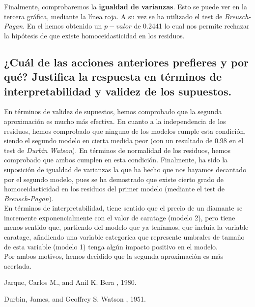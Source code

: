 \documentclass[a4paper, 9pt]{article}
\begin{document}
Finalmente, comprobaremos la \textbf{igualdad de varianzas}. Esto se puede ver en la tercera gráfica, mediante la línea roja. A su vez se ha utilizado el test de \textit{Breusch-Pagan}. En el hemos obtenido un $p-valor$ de 0.2441 lo cual nos permite rechazar la hipótesis de que existe homoceidasticidad en los residuos.

\subsection{¿Cuál de las acciones anteriores prefieres y por qué? Justifica la respuesta en términos de interpretabilidad y validez de los supuestos.}
\label{subsec:question-4}

En términos de validez de supuestos, hemos comprobado que la segunda aproximación es mucho más efectiva. En cuanto a la independencia de los residuos, hemos comprobado que ninguno de los modelos cumple esta condición, siendo el segundo modelo en cierta medida peor (con un resultado de 0.98 en el test de \textit{Durbin Watson}). En términos de normalidad de los residuos, hemos comprobado que ambos cumplen en esta condición. Finalmente, ha sido la suposición de igualdad de varianzas la que ha hecho que nos hayamos decantado por el segundo modelo, pues se ha demostrado que existe cierto grado de homoceidasticidad en los residuos del primer modelo (mediante el test de \textit{Breusch-Pagan}). \\

En términos de interpretabilidad, tiene sentido que el precio de un diamante se incremente exponencialmente con el valor de caratage (modelo 2), pero tiene menos sentido que, partiendo del modelo que ya teníamos, que incluía la variable caratage, añadiendo una variable categorica que represente umbrales de tamaño de esta variable (modelo 1) tenga algún impacto positivo en el modelo.\\

Por ambos motivos, hemos decidido que la segunda aproximación es más acertada.

\begin{thebibliography}{9}
    Jarque, Carlos M., and Anil K. Bera
    , 1980.
    
    Durbin, James, and Geoffrey S. Watson
    , 1951.

\end{thebibliography}
\end{document}
